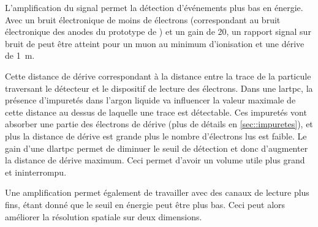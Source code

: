 
      L'amplification du signal permet la détection d'événements plus bas en énergie. Avec un bruit électronique de moins de  électrons (correspondant au bruit électronique des anodes du prototype de \TOO{}) et un gain de 20, un rapport signal sur bruit de  peut être atteint pour un muon au minimum d'ionisation et une dérive de \SI{1}{\meter}.

      Cette distance de dérive correspondant à la distance entre la trace de la particule traversant le détecteur et le dispositif de lecture des électrons. Dans une \gls{lartpc}, la présence d'impuretés dans l'argon liquide va influencer la valeur maximale de cette distance au dessus de laquelle une trace est détectable. Ces impuretés vont absorber une partie des électrons de dérive (plus de détails en \autoref{sec::impuretes}), et plus la distance de dérive est grande plus le nombre d'électrons lus est faible. Le gain d'une \gls{dlartpc} permet de diminuer le seuil de détection et donc d'augmenter la distance de dérive maximum. Ceci permet d'avoir un volume utile plus grand et ininterrompu.

      Une amplification permet également de travailler avec des canaux de lecture plus fins, étant donné que le seuil en énergie peut être plus bas. Ceci peut alors améliorer la résolution spatiale sur deux dimensions.

